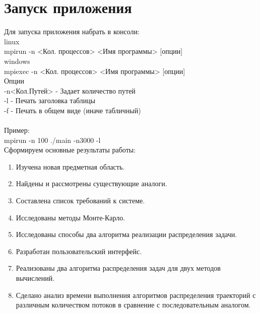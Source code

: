 \section{Запуск приложения}
Для запуска приложения набрать в консоли:\\
linux\\
	mpirun -n <Кол. процессов> <Имя программы> [опции]\\
windows\\
	mpiexec -n <Кол. процессов> <Имя программы> [опции]\\
Опции\\
-n<Кол.Путей> - Задает количество путей\\
-l  - Печать заголовка таблицы\\
-f - Печать в общем виде (иначе табличный)\\
\\
Пример:\\
	mpirun -n 100 ./main -n3000 -l\\
\newpage{}
 Сформируем основные результаты работы:
 \begin{enumerate}
	\item Изучена новая предметная область. 
	\item Найдены и рассмотрены существующие аналоги.
	\item Составлена список требований к системе.
	\item Исследованы методы Монте-Карло.
	\item Исследованы способы два алгоритма реализации распределения задачи.
	\item Разработан пользовательский интерфейс.
	\item Реализованы два алгоритма распределения задач для двух методов вычислений. 
	\item Сделано анализ времени выполнения алгоритмов распределения траекторий с различным количеством потоков в сравнение с последовательным аналогом.
\end{enumerate}
